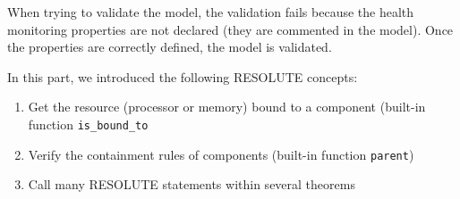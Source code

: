 \documentclass[times, 10pt]{article}
\begin{document}
When trying to validate the model, the validation fails because the health
monitoring properties are not declared (they are commented in the model).
Once the properties are correctly defined, the model is validated.


In this part, we introduced the following RESOLUTE concepts:
\begin{enumerate}
    \item
        Get the resource (processor or memory) bound to a component (built-in
        function \texttt{is\_bound\_to}
    \item
        Verify the containment rules of components (built-in function
        \texttt{parent})
    \item
        Call many RESOLUTE statements within several theorems
\end{enumerate}
\end{document}
